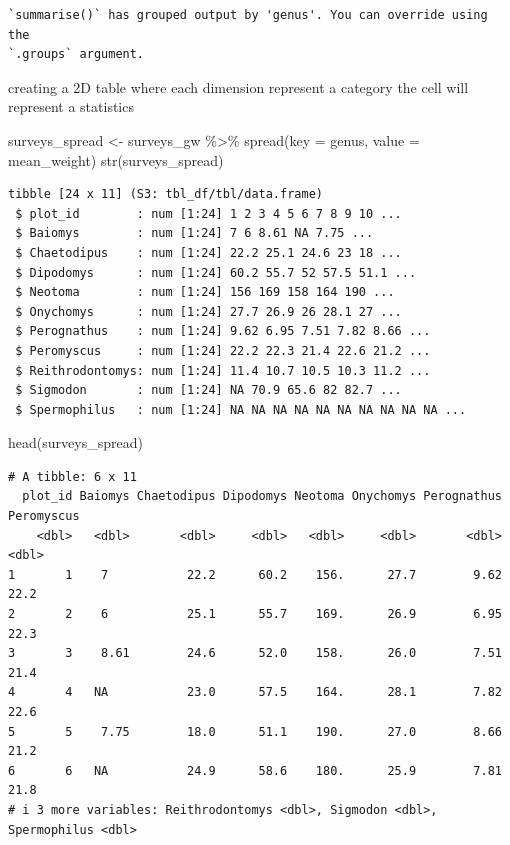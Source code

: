 \documentclass[
  letterpaper,
  DIV=11,
  numbers=noendperiod]{scrreprt}
\newenvironment{Shaded}{\begin{snugshade}}{\end{snugshade}}
\newcommand{\AttributeTok}[1]{\textcolor[rgb]{0.40,0.45,0.13}{#1}}
\newcommand{\FunctionTok}[1]{\textcolor[rgb]{0.28,0.35,0.67}{#1}}
\newcommand{\NormalTok}[1]{\textcolor[rgb]{0.00,0.23,0.31}{#1}}
\newcommand{\OtherTok}[1]{\textcolor[rgb]{0.00,0.23,0.31}{#1}}
\newcommand{\SpecialCharTok}[1]{\textcolor[rgb]{0.37,0.37,0.37}{#1}}
\begin{document}
\begin{verbatim}
`summarise()` has grouped output by 'genus'. You can override using the
`.groups` argument.
\end{verbatim}

creating a 2D table where each dimension represent a category the cell
will represent a statistics

\begin{Shaded}
\begin{Highlighting}[]
\NormalTok{surveys\_spread }\OtherTok{\textless{}{-}}\NormalTok{ surveys\_gw }\SpecialCharTok{\%\textgreater{}\%}
  \FunctionTok{spread}\NormalTok{(}\AttributeTok{key =}\NormalTok{ genus, }\AttributeTok{value =}\NormalTok{ mean\_weight)}
\FunctionTok{str}\NormalTok{(surveys\_spread)}
\end{Highlighting}
\end{Shaded}

\begin{verbatim}
tibble [24 x 11] (S3: tbl_df/tbl/data.frame)
 $ plot_id        : num [1:24] 1 2 3 4 5 6 7 8 9 10 ...
 $ Baiomys        : num [1:24] 7 6 8.61 NA 7.75 ...
 $ Chaetodipus    : num [1:24] 22.2 25.1 24.6 23 18 ...
 $ Dipodomys      : num [1:24] 60.2 55.7 52 57.5 51.1 ...
 $ Neotoma        : num [1:24] 156 169 158 164 190 ...
 $ Onychomys      : num [1:24] 27.7 26.9 26 28.1 27 ...
 $ Perognathus    : num [1:24] 9.62 6.95 7.51 7.82 8.66 ...
 $ Peromyscus     : num [1:24] 22.2 22.3 21.4 22.6 21.2 ...
 $ Reithrodontomys: num [1:24] 11.4 10.7 10.5 10.3 11.2 ...
 $ Sigmodon       : num [1:24] NA 70.9 65.6 82 82.7 ...
 $ Spermophilus   : num [1:24] NA NA NA NA NA NA NA NA NA NA ...
\end{verbatim}

\begin{Shaded}
\begin{Highlighting}[]
\FunctionTok{head}\NormalTok{(surveys\_spread)}
\end{Highlighting}
\end{Shaded}

\begin{verbatim}
# A tibble: 6 x 11
  plot_id Baiomys Chaetodipus Dipodomys Neotoma Onychomys Perognathus Peromyscus
    <dbl>   <dbl>       <dbl>     <dbl>   <dbl>     <dbl>       <dbl>      <dbl>
1       1    7           22.2      60.2    156.      27.7        9.62       22.2
2       2    6           25.1      55.7    169.      26.9        6.95       22.3
3       3    8.61        24.6      52.0    158.      26.0        7.51       21.4
4       4   NA           23.0      57.5    164.      28.1        7.82       22.6
5       5    7.75        18.0      51.1    190.      27.0        8.66       21.2
6       6   NA           24.9      58.6    180.      25.9        7.81       21.8
# i 3 more variables: Reithrodontomys <dbl>, Sigmodon <dbl>, Spermophilus <dbl>
\end{verbatim}
\end{document}
